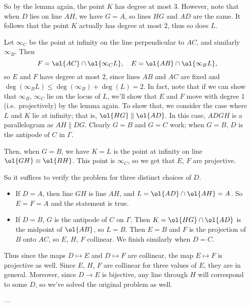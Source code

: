 So by the lemma again, the point $K$ has degree at most $3$.
However, note that when $D$ lies on line $AH$,
we have $G=A$, so lines $HG$ and $AD$ are the same.
It follows that the point $K$ actually has degree at most $2$,
thus so does $L$.

Let $\infty_C$ be the point at infinity
on the line perpendicular to $AC$, and similarly $\infty_B$.
Then \[ F = \ol{AC} \cap \ol{\infty_C L},
  \quad E = \ol{AB} \cap \ol{\infty_B L},\]
so $E$ and $F$ have degree at most $2$,
since lines $AB$ and $AC$ are fixed and $\deg(\infty_B L) \leq \deg(\infty_B)+\deg(L)=2$.
In fact, note that if we can show that $\infty_B$, $\infty_C$ lie on the locus of $L$,
we'll show that $E$ and $F$ move with degree 1 (i.e.\ projectively) by the lemma again. To show that, we consider the case where $L$ and $K$ lie at infinity;
that is, $\ol{HG} \parallel \ol{AD}$.
In this case, $ADGH$ is a parallelogram as $AH \parallel DG$.
Clearly $G=B$ and $G=C$ work;
when $G=B$, $D$ is the antipode of $C$ in $\Gamma$.

Then, when $G=B$, we have $K=L$ is the point at
infinity on line $\ol{GH} \equiv \ol{BH}$.
This point is $\infty_C$, so we get that $E$, $F$ are projective.

So it suffices to verify the problem for three distinct choices of $D$.
\begin{itemize}
\item If $D=A$, then line $GH$ is line $AH$,
  and $L = \ol{AD} \cap \ol{AH} = A$.
  So $E=F=A$ and the statement is true.
\item If $D=B$, $G$ is the antipode of $C$ on $\Gamma$.
  Then $K = \ol{HG} \cap \ol{AD}$ is the midpoint of $\ol{AB}$, so $L=B$.
  Then $E=B$ and $F$ is the projection of $B$ onto $AC$,
  so $E$, $H$, $F$ collinear.
\ii We finish similarly when $D=C$.
\end{itemize}
Thus since the maps $D \mapsto E$ and $D \mapsto F$ are collinear,
the map $E \mapsto F$ is projective as well.
Since $E$, $H$, $F$ are collinear for three values of $E$,
they are in general.
Moreover, since $D \to E$ is bijective,
any line through $H$ will correspond to some $D$,
so we've solved the original problem as well.


---

